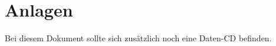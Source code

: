 \documentclass[paper=a4,fontsize=11pt,twoside=true,headings=openright,parskip=full,DIV=14,draft=false]{scrbook}
\begin{document}
  \frontmatter
  
  \tableofcontents
  \todototoc
  \listoftodos
  \mainmatter
  
  
  
  
  
  \appendix
  \chapter{Anlagen}
  Bei diesem Dokument sollte sich zusätzlich noch eine Daten-CD befinden.
  \backmatter
  \printbibliography[title={Quellen}]
\end{document}
